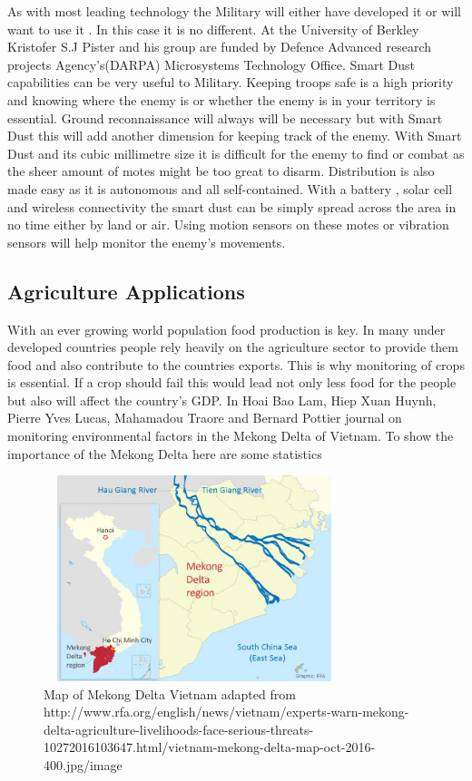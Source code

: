 \documentclass[article]{IEEEtran}
\begin{document}
As with most leading technology the Military will either have developed it or will want to use it . In this case it is no different. At the University of Berkley Kristofer S.J Pister and his group are funded by Defence Advanced research projects Agency’s(DARPA) Microsystems Technology Office\cite{Mili}. Smart Dust capabilities can be very useful to Military. Keeping troops safe is a high priority and knowing where the enemy is or whether the enemy is in your territory is essential.
Ground reconnaissance will always will be necessary but with Smart Dust this will add another dimension for keeping track of the enemy.  With Smart Dust and its cubic millimetre size it is difficult for the enemy to find or combat as the sheer amount of motes might be too great to disarm. Distribution is also made easy as it is autonomous and all self-contained. With a battery , solar cell and wireless connectivity the smart dust can be simply spread across the area in no time either by land or air\cite{Lightweight}. Using motion sensors on these motes or vibration sensors will help monitor the enemy’s movements\cite{friendorfoe}.

\subsection{Agriculture Applications}

With an ever growing world population food production is key. In many under developed countries people rely heavily on the agriculture sector to provide them food and also contribute to the countries exports. This is why monitoring of crops is essential. If a crop should fail this would lead not only less food for the people but also will affect the country’s GDP. In Hoai Bao Lam, Hiep Xuan Huynh, Pierre Yves Lucas, Mahamadou Traore and Bernard Pottier journal on monitoring environmental factors in the Mekong Delta of Vietnam. To show the importance of the Mekong Delta here are some statistics\cite{MekongDelta}

\begin{figure}[h!]
\graphicspath{ {images/} }
\includegraphics[width=8.8cm, height=6cm]{mekongdelta}
\caption{Map of Mekong Delta Vietnam adapted from http://www.rfa.org/english/news/vietnam/experts-warn-mekong-delta-agriculture-livelihoods-face-serious-threats-10272016103647.html/vietnam-mekong-delta-map-oct-2016-400.jpg/image}
\label{Map of Mekong Delta}
\end{figure}
\end{document}
